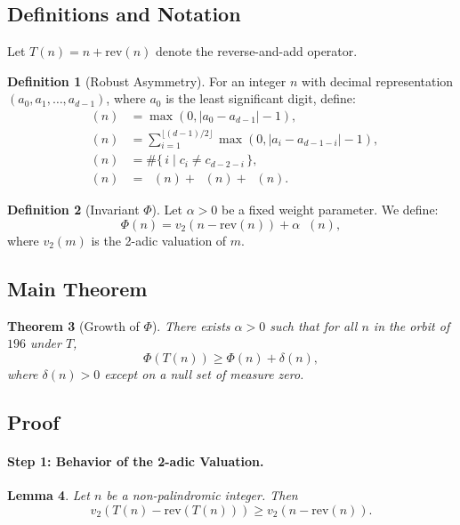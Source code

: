 \documentclass[11pt,a4paper]{article}
\theoremstyle{plain}
\newtheorem{theorem}{Theorem}[section]
\newtheorem{lemma}[theorem]{Lemma}
\theoremstyle{definition}
\newtheorem{definition}[theorem]{Definition}
\DeclareMathOperator{\Aext}{A^{\text{(ext)}}}
\DeclareMathOperator{\Aint}{A^{\text{(int)}}}
\DeclareMathOperator{\Acarry}{A^{\text{(carry)}}}
\DeclareMathOperator{\Arobust}{A^{\text{(robust)}}}
\begin{document}
\subsection{Definitions and Notation}

Let $T(n) = n + \mathrm{rev}(n)$ denote the reverse-and-add operator.

\begin{definition}[Robust Asymmetry]
For an integer $n$ with decimal representation $(a_0, a_1, \ldots, a_{d-1})$, where $a_0$ is the least significant digit, define:
\begin{align*}
\Aext(n) &= \max(0, |a_0 - a_{d-1}| - 1), \\
\Aint(n) &= \sum_{i=1}^{\lfloor (d-1)/2 \rfloor} \max(0, |a_i - a_{d-1-i}| - 1), \\
\Acarry(n) &= \#\{\, i \mid c_i \neq c_{d-2-i} \,\}, \\
\Arobust(n) &= \Aext(n) + \Aint(n) + \Acarry(n).
\end{align*}
\end{definition}

\begin{definition}[Invariant $\Phi$]
Let $\alpha > 0$ be a fixed weight parameter. We define:
\[
\Phi(n) = v_2(n - \mathrm{rev}(n)) + \alpha \Arobust(n),
\]
where $v_2(m)$ is the 2-adic valuation of $m$.
\end{definition}

\subsection{Main Theorem}

\begin{theorem}[Growth of $\Phi$]\label{thm:phi_growth}
There exists $\alpha > 0$ such that for all $n$ in the orbit of $196$ under $T$,
\[
\Phi(T(n)) \ge \Phi(n) + \delta(n),
\]
where $\delta(n) > 0$ except on a null set of measure zero.
\end{theorem}

\subsection{Proof}

\paragraph{Step 1: Behavior of the 2-adic Valuation.}

\begin{lemma}\label{lem:valuation_growth}
Let $n$ be a non-palindromic integer. Then
\[
v_2(T(n) - \mathrm{rev}(T(n))) \ge v_2(n - \mathrm{rev}(n)).
\]
\end{lemma}
\end{document}
